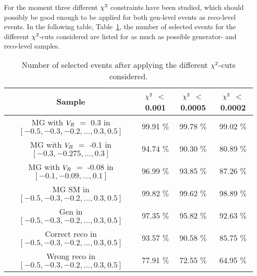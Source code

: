 For the moment three different $\chi^{2}$ constraints have been studied, which should possibly be good enough to be applied for both gen-level events as reco-level events.
In the following table, Table~\ref{table::ChiSqCuts}, the number of selected events for the different $\chi^{2}$-cuts considered are listed for as much as possible generator- and reco-level samples.
\\
\begin{table}[h!t]
 \centering
 \caption{Number of selected events after applying the different $\chi^{2}$-cuts considered. } 
 \label{table::ChiSqCuts}
 \begin{tabular}{c|c|c|c}
  Sample 									& $\chi^{2}$ $<$ 0.001 	& $\chi^{2}$ $<$ 0.0005 	& $\chi^{2}$ $<$ 0.0002 	\\
  \hline
  MG with $V_{R}$ $=$ 0.3 in $\left[-0.5, -0.3, -0.2, ..., 0.3, 0.5 \right]$ 	& 99.91 $\%$		& 99.78 $\%$		& 99.02 $\%$		\\
  MG with $V_{R}$ $=$ -0.1 in $\left[-0.3, -0.275, ..., 0.3 \right]$ 		& 94.74 $\%$		& 90.30 $\%$		& 80.89 $\%$		\\
  MG with $V_{R}$ $=$ -0.08 in $\left[-0.1, -0.09, ..., 0.1 \right]$ 		& 96.99 $\%$		& 93.85 $\%$		& 87.26 $\%$		\\
  MG SM in $\left[-0.5, -0.3, -0.2, ..., 0.3, 0.5 \right]$ 			& 99.82 $\%$		& 99.62 $\%$		& 98.89 $\%$		\\
  Gen in $\left[-0.5, -0.3, -0.2, ..., 0.3, 0.5 \right]$ 			& 97.35 $\%$		& 95.82 $\%$		& 92.63 $\%$		\\
  Correct reco in $\left[-0.5, -0.3, -0.2, ..., 0.3, 0.5 \right]$ 	 	& 93.57 $\%$		& 90.58 $\%$		& 85.75 $\%$		\\
  Wrong reco in $\left[-0.5, -0.3, -0.2, ..., 0.3, 0.5 \right]$			& 77.91 $\%$		& 72.55 $\%$		& 64.95 $\%$		\\
  \hline
 \end{tabular}
\end{table}

